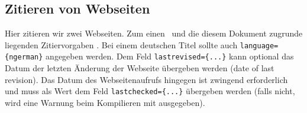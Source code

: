 \documentclass[a4paper,10pt]{scrartcl}
\begin{document}

\subsection{Zitieren von Webseiten}
Hier zitieren wir zwei Webseiten. Zum einen~
und die diesem Dokument zugrunde liegenden Zitiervorgaben
. Bei einem deutschen Titel sollte auch
\verb|language={ngerman}| angegeben werden. Dem Feld \verb|lastrevised={...}|
kann optional das Datum der letzten Änderung der Webseite übergeben werden
(date of last revision). Das Datum des Webseitenaufrufs hingegen ist zwingend
erforderlich und muss als Wert dem Feld
\verb|lastchecked={...}| übergeben werden (falls nicht, wird eine
Warnung beim Kompilieren mit  ausgegeben).
\end{document}
